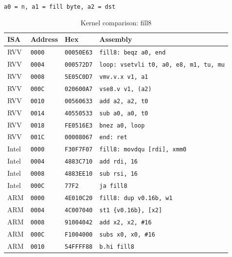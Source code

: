 \begin{table}[htbp]
\centering
\caption{Kernel comparison: fill8}
\begingroup
\scriptsize
\setlength{\tabcolsep}{4pt}
\noindent \texttt{a0 = n, a1 = fill byte, a2 = dst}\par
\vspace{0.6ex}
\begin{tabular}{@{}l|l|l|p{7.2cm}@{}}
\toprule
ISA & Address & Hex & Assembly \\
\midrule
RVV & \texttt{0000} & \texttt{00050E63} & \texttt{fill8: beqz a0, end} \\
RVV & \texttt{0004} & \texttt{000572D7} & \texttt{loop: vsetvli t0, a0, e8, m1, tu, mu} \\
RVV & \texttt{0008} & \texttt{5E05C0D7} & \texttt{vmv.v.x v1, a1} \\
RVV & \texttt{000C} & \texttt{020600A7} & \texttt{vse8.v v1, (a2)} \\
RVV & \texttt{0010} & \texttt{00560633} & \texttt{add a2, a2, t0} \\
RVV & \texttt{0014} & \texttt{40550533} & \texttt{sub a0, a0, t0} \\
RVV & \texttt{0018} & \texttt{FE0516E3} & \texttt{bnez a0, loop} \\
RVV & \texttt{001C} & \texttt{00008067} & \texttt{end: ret} \\
\midrule
Intel & \texttt{0000} & \texttt{F30F7F07} & \texttt{fill8: movdqu [rdi], xmm0} \\
Intel & \texttt{0004} & \texttt{4883C710} & \texttt{add rdi, 16} \\
Intel & \texttt{0008} & \texttt{4883EE10} & \texttt{sub rsi, 16} \\
Intel & \texttt{000C} & \texttt{77F2} & \texttt{ja fill8} \\
\midrule
ARM & \texttt{0000} & \texttt{4E010C20} & \texttt{fill8: dup v0.16b, w1} \\
ARM & \texttt{0004} & \texttt{4C007040} & \texttt{st1 \{v0.16b\}, [x2]} \\
ARM & \texttt{0008} & \texttt{91004042} & \texttt{add x2, x2, \#16} \\
ARM & \texttt{000C} & \texttt{F1004000} & \texttt{subs x0, x0, \#16} \\
ARM & \texttt{0010} & \texttt{54FFFF88} & \texttt{b.hi fill8} \\
\bottomrule
\end{tabular}
\endgroup
\end{table}
\noindent{}\par
